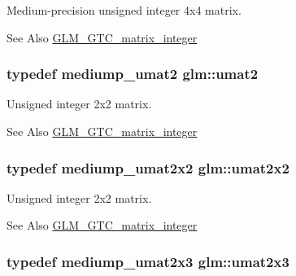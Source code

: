 Medium-\/precision unsigned integer 4x4 matrix. \begin{DoxySeeAlso}{See Also}
\hyperlink{group__gtc__matrix__integer}{G\-L\-M\-\_\-\-G\-T\-C\-\_\-matrix\-\_\-integer} 
\end{DoxySeeAlso}
\hypertarget{group__gtc__matrix__integer_gae2d45c058cfa0b60ab4df0cdda2d8516}{
\subsubsection[{umat2}]{\setlength{\rightskip}{0pt plus 5cm}typedef mediump\-\_\-umat2 {\bf glm\-::umat2}}}\label{group__gtc__matrix__integer_gae2d45c058cfa0b60ab4df0cdda2d8516}
Unsigned integer 2x2 matrix. \begin{DoxySeeAlso}{See Also}
\hyperlink{group__gtc__matrix__integer}{G\-L\-M\-\_\-\-G\-T\-C\-\_\-matrix\-\_\-integer} 
\end{DoxySeeAlso}
\hypertarget{group__gtc__matrix__integer_gad3c997b31dd69bdb4787867e758ed48d}{
\subsubsection[{umat2x2}]{\setlength{\rightskip}{0pt plus 5cm}typedef mediump\-\_\-umat2x2 {\bf glm\-::umat2x2}}}\label{group__gtc__matrix__integer_gad3c997b31dd69bdb4787867e758ed48d}
Unsigned integer 2x2 matrix. \begin{DoxySeeAlso}{See Also}
\hyperlink{group__gtc__matrix__integer}{G\-L\-M\-\_\-\-G\-T\-C\-\_\-matrix\-\_\-integer} 
\end{DoxySeeAlso}
\hypertarget{group__gtc__matrix__integer_ga890ae28f9230794138b2c89f44ce3376}{
\subsubsection[{umat2x3}]{\setlength{\rightskip}{0pt plus 5cm}typedef mediump\-\_\-umat2x3 {\bf glm\-::umat2x3}}}\label{group__gtc__matrix__integer_ga890ae28f9230794138b2c89f44ce3376}

